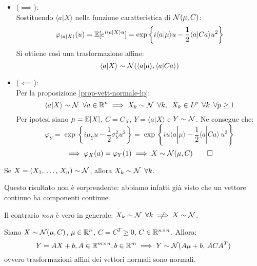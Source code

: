 \begin{dimo}
  \Fixvmode
  \begin{itemize}
    \item ($\implies$):\\
      Sostituendo $\langle a | X \rangle$ nella funzione caratteristica di $\mathcal N(\mu, C)$:
      $$\varphi_{\langle a | X \rangle} (u) = \mathbb E[e^{i \langle a | X \rangle u}] = \exp\left\{i\langle a | \mu \rangle u - \frac{1}{2}\langle a | Ca \rangle u^2\right\}$$
      Si ottiene così una trasformazione affine:
      $$\langle a | X \rangle \sim \mathcal N(\langle a | \mu \rangle, \langle a | Ca \rangle )$$
    \item ($\impliedby$): \\
      Per la proposizione \ref{prop-vett-normale-lp}:
      $$\langle a|X \rangle \sim \mathcal N \enspace \forall a \in \mathbb R^n \implies X_k \sim \mathcal N \enspace \forall k, \enspace X_k \in L^p \enspace \forall k \enspace \forall p \geq 1$$
      Per ipotesi siano $\mu = \mathbb E[X]$, $C=C_X$, $Y = \langle a | X \rangle$ e $Y \sim \mathcal N$. Ne consegue che:
      $$\varphi_Y = \exp \left\{i\mu_Yu -\frac{1}{2}\sigma_Y^2u^2 \right\} = \exp \left\{ iu\langle a |  \mu \rangle -\frac{1}{2}\langle a | Ca \rangle \, u^2 \right\}$$
      $$\implies \varphi_X (a) = \varphi_Y(1) \implies X \sim \mathcal N(\mu, C) \qedhere$$
  \end{itemize}
\end{dimo}

\medskip
\begin{teo}
  Se $X = (X_1, \, \dots, \, X_n) \sim \mathcal N$, allora $X_k \sim \mathcal N \enspace \forall k$.
\end{teo}
Questo risultato non è sorprendente: abbiamo infatti già visto che un vettore continuo ha componenti continue.
\begin{nb}
  Il contrario \emph{non} è vero in generale: $X_k \sim \Nc \enspace \forall k \centernot \implies X \sim \Nc$.
\end{nb}

\medskip
\begin{prop}
\label{prop-linearita-normali}
  Siano $X \sim \mathcal N(\mu, C)$, $\mu \in \mathbb R^n$, $C = C^T \geq 0$, $C \in \mathbb R^{n \times n}$. Allora:
  $$Y = AX+b, A \in \mathbb R^{m \times n}, b \in \mathbb R^m \implies Y \sim \mathcal N(A\mu+b, \, ACA^T)$$
  ovvero trasformazioni affini dei vettori normali sono normali.
\end{prop}


